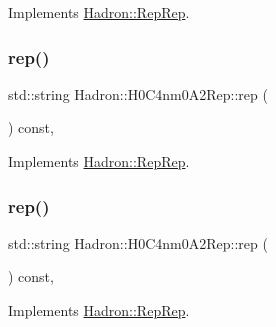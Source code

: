 Implements \mbox{\hyperlink{structHadron_1_1RepRep_ab3213025f6de249f7095892109575fde}{Hadron\+::\+Rep\+Rep}}.

\mbox{\label{structHadron_1_1H0C4nm0A2Rep_a82046f2360bc0682e6b0f7ce6b03286c}} 
\subsubsection{\texorpdfstring{rep()}{rep()}\hspace{0.1cm}{\footnotesize\ttfamily [2/5]}}
{\footnotesize\ttfamily std\+::string Hadron\+::\+H0\+C4nm0\+A2\+Rep\+::rep (\begin{DoxyParamCaption}{ }\end{DoxyParamCaption}) const\hspace{0.3cm}{\ttfamily [inline]}, {\ttfamily [virtual]}}



Implements \mbox{\hyperlink{structHadron_1_1RepRep_ab3213025f6de249f7095892109575fde}{Hadron\+::\+Rep\+Rep}}.

\mbox{\label{structHadron_1_1H0C4nm0A2Rep_a82046f2360bc0682e6b0f7ce6b03286c}} 
\subsubsection{\texorpdfstring{rep()}{rep()}\hspace{0.1cm}{\footnotesize\ttfamily [3/5]}}
{\footnotesize\ttfamily std\+::string Hadron\+::\+H0\+C4nm0\+A2\+Rep\+::rep (\begin{DoxyParamCaption}{ }\end{DoxyParamCaption}) const\hspace{0.3cm}{\ttfamily [inline]}, {\ttfamily [virtual]}}



Implements \mbox{\hyperlink{structHadron_1_1RepRep_ab3213025f6de249f7095892109575fde}{Hadron\+::\+Rep\+Rep}}.

\mbox{\label{structHadron_1_1H0C4nm0A2Rep_a82046f2360bc0682e6b0f7ce6b03286c}} 
